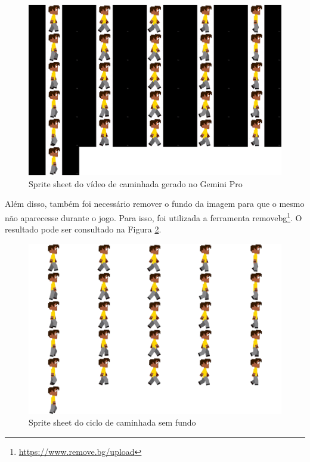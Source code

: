 \begin{figure}[htbp]
    \centering
    \caption{\small Sprite sheet do vídeo de caminhada gerado no Gemini Pro}
    \label{fig:geminiProAndarSpriteSheet}
    \includegraphics[width=0.8\linewidth]{figs/geminiPro/sprite sheet/video3.png}
\end{figure}

Além disso, também foi necessário remover o fundo da imagem para que o mesmo não aparecesse durante o jogo. Para isso, foi utilizada a ferramenta removebg\footnote{\url{https://www.remove.bg/upload}}. O resultado pode ser consultado na Figura \ref{fig:geminiProAndarSpriteSheetSemFundo}.

\begin{figure}[htbp]
    \centering
    \caption{\small Sprite sheet do ciclo de caminhada sem fundo}
    \label{fig:geminiProAndarSpriteSheetSemFundo}
    \includegraphics[width=0.8\linewidth]{figs/geminiPro/sprite sheet/sprite_fundo_transparente3.png}
\end{figure}



